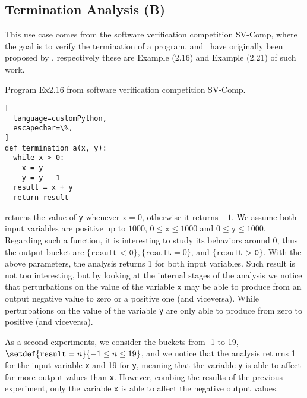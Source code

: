 \subsection{Termination Analysis (B)}

This use case comes from the software verification competition SV-Comp, where the goal is to verify the termination of a program.  and~ have originally been proposed by , respectively these are Example (2.16) and Example (2.21) of such work.

\begin{marginlisting}
  \caption{Program Ex2.16 from software verification competition SV-Comp.}
  \vspace{0.5cm}
\begin{lstlisting}[
  language=customPython,
  escapechar=\%,
]
def termination_a(x, y):
  while x > 0:
    x = y
    y = y - 1
  result = x + y
  return result
\end{lstlisting}
\end{marginlisting}


 returns the value of \texttt{y} whenever $\texttt{x} = 0$, otherwise it returns $-1$.
We assume both input variables are positive up to $1000$, $0 \le \texttt{x} \le 1000$ and $0 \le \texttt{y} \le 1000$.
Regarding such a function, it is interesting to study its behaviors around $0$, thus the output bucket are $\{ \texttt{result < 0} \}, \{ \texttt{result} = 0 \}$, and $\{ \texttt{result > 0} \}$.
With the above parameters, the analysis \outcomesname{} returns 1 for both input variables.
Such result is not too interesting, but by looking at the internal stages of the analysis we notice that perturbations on the value of the variable \texttt{x} may be able to produce from an output negative value to zero or a positive one (and viceversa).
While perturbations on the value of the variable \texttt{y} are only able to produce from zero to positive (and viceversa).

As a second experiments, we consider the buckets from -1 to 19, $\setdef{ \texttt{result} = n}{-1 \le n \le 19}$, and we notice that the analysis \outcomesname{} returns 1 for the input variable \texttt{x} and 19 for \texttt{y}, meaning that the variable \texttt{y} is able to affect far more output values than \texttt{x}. However, combing the results of the previous experiment, only the variable \texttt{x} is able to affect the negative output values.

